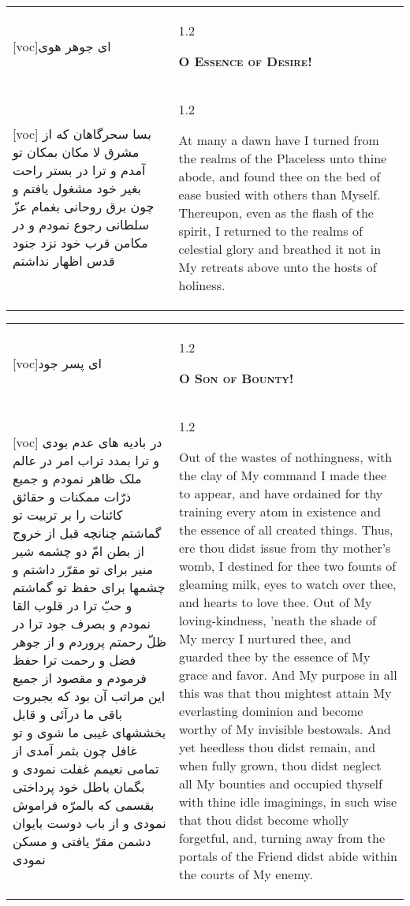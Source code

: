 \documentclass[11pt]{article}
\makeatletter
\newenvironment{orig}
  {\begin{farsi}[voc]}
  {\end{farsi}}
\newenvironment{trans}
  {\Large\begin{spacing}{1.2}\raggedright}
  {\end{spacing}}
\newenvironment{word}
  {\begin{tabular}[t]{p{2.75in}@{\hspace{3em}}p{2.75in}}}
  {\end{tabular}}
\newcommand{\ayat}[2]{\begin{orig}#1\end{orig} & \begin{trans}#2\end{trans}}
\newcommand{\heading}[2]{\textsc{\textbf{#1}} %
}
\makeatother
\begin{document}
\pagebreak

\begin{word}
\ayat{ای جوهر هوی}{\heading{O Essence of Desire!}{}} \\ \ayat{
بسا سحرگاهان که از مشرق لا مکان بمکان تو آمدم و ترا در بستر راحت بغير خود مشغول يافتم و چون برق روحانی بغمام عزّ سلطانی رجوع نمودم و در مکامن قرب خود نزد جنود قدس اظهار نداشتم
}{
  At many a dawn have I turned from the realms of the Placeless unto thine
  abode, and found thee on the bed of ease busied with others than Myself.
  Thereupon, even as the flash of the spirit, I returned to the realms of
  celestial glory and breathed it not in My retreats above unto the hosts of
  holiness.
}
\end{word}

\pagebreak

\begin{word}
\ayat{ای پسر جود}{\heading{O Son of Bounty!}{}} \\ \ayat{
در باديه های عدم بودی و ترا بمدد تراب امر در عالم ملک ظاهر نمودم و جميع ذرّات ممکنات و حقائق کائنات را بر تربيت تو گماشتم چنانچه قبل از خروج از بطن امّ دو چشمه شير منير برای تو مقرّر داشتم و چشمها برای حفظ تو گماشتم و حبّ ترا در قلوب القا نمودم و بصرف جود ترا در ظلّ رحمتم پروردم و از جوهر فضل و رحمت ترا حفظ فرمودم
و مقصود از جميع اين مراتب آن بود که بجبروت باقی ما درآئی و قابل بخششهای غيبی ما شوی و تو غافل چون بثمر آمدی از تمامی نعيمم غفلت نمودی و بگمان باطل خود پرداختی بقسمی که بالمرّه فراموش نمودی و از باب دوست بايوان دشمن مقرّ يافتی و مسکن نمودی
}{
  Out of the wastes of nothingness, with the clay of My command I made thee to
  appear, and have ordained for thy training every atom in existence and the
  essence of all created things. Thus, ere thou didst issue from thy mother's
  womb, I destined for thee two founts of gleaming milk, eyes to watch over
  thee, and hearts to love thee. Out of My loving-kindness, 'neath the shade
  of My mercy I nurtured thee, and guarded thee by the essence of My grace and
  favor. And My purpose in all this was that thou mightest attain My
  everlasting dominion and become worthy of My invisible bestowals. And yet
  heedless thou didst remain, and when fully grown, thou didst neglect all My
  bounties and occupied thyself with thine idle imaginings, in such wise that
  thou didst become wholly forgetful, and, turning away from the portals of
  the Friend didst abide within the courts of My enemy.
}
\end{word}

\pagebreak
\end{document}
